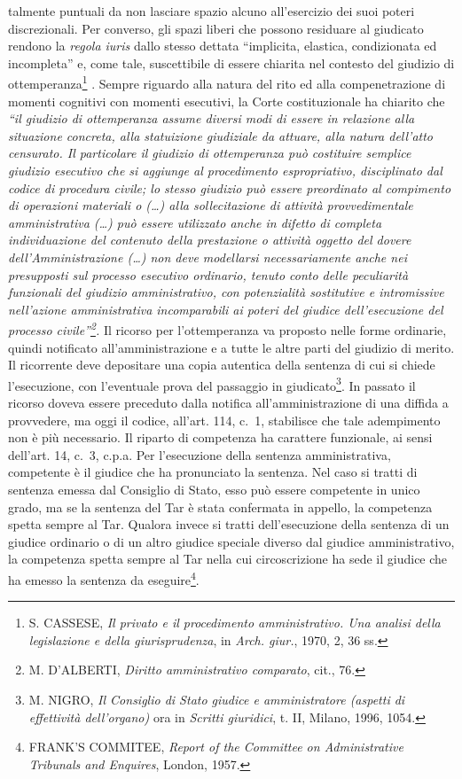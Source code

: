 \documentclass[12pt,it,a4paper,]{report}
\begin{document}
talmente puntuali da non lasciare spazio alcuno all'esercizio dei suoi
poteri discrezionali. Per converso, gli spazi liberi che possono
residuare al giudicato rendono la \emph{regola iuris} dallo stesso
dettata ``implicita, elastica, condizionata ed incompleta'' e, come
tale, suscettibile di essere chiarita nel contesto del giudizio di
ottemperanza\footnote{S. CASSESE, \emph{Il privato e il procedimento
  amministrativo. Una analisi della legislazione e della
  giurisprudenza}, in \emph{Arch. giur.}, 1970, 2, 36 ss.} . Sempre
riguardo alla natura del rito ed alla compenetrazione di momenti
cognitivi con momenti esecutivi, la Corte costituzionale ha chiarito che
\emph{``il giudizio di ottemperanza assume diversi modi di essere in
relazione alla situazione concreta, alla statuizione giudiziale da
attuare, alla natura dell'atto censurato. Il particolare il giudizio di
ottemperanza può costituire semplice giudizio esecutivo che si aggiunge
al procedimento espropriativo, disciplinato dal codice di procedura
civile; lo stesso giudizio può essere preordinato al compimento di
operazioni materiali o (\ldots) alla sollecitazione di attività
provvedimentale amministrativa (\ldots) può essere utilizzato anche in
difetto di completa individuazione del contenuto della prestazione o
attività oggetto del dovere dell'Amministrazione (\ldots) non deve
modellarsi necessariamente anche nei presupposti sul processo esecutivo
ordinario, tenuto conto delle peculiarità funzionali del giudizio
amministrativo, con potenzialità sostitutive e intromissive nell'azione
amministrativa incomparabili ai poteri del giudice dell'esecuzione del
processo civile''\footnote{M. D'ALBERTI, \emph{Diritto amministrativo
  comparato}, cit., 76.}.} Il ricorso per l'ottemperanza va proposto
nelle forme ordinarie, quindi notificato all'amministrazione e a tutte
le altre parti del giudizio di merito. Il ricorrente deve depositare una
copia autentica della sentenza di cui si chiede l'esecuzione, con
l'eventuale prova del passaggio in giudicato\footnote{M. NIGRO, \emph{Il
  Consiglio di Stato giudice e amministratore (aspetti di effettività
  dell'organo)} ora in \emph{Scritti giuridici}, t. II, Milano, 1996,
  1054.}. In passato il ricorso doveva essere preceduto dalla notifica
all'amministrazione di una diffida a provvedere, ma oggi il codice,
all'art. 114, c.~1, stabilisce che tale adempimento non è più
necessario. Il riparto di competenza ha carattere funzionale, ai sensi
dell'art. 14, c.~3, c.p.a. Per l'esecuzione della sentenza
amministrativa, competente è il giudice che ha pronunciato la sentenza.
Nel caso si tratti di sentenza emessa dal Consiglio di Stato, esso può
essere competente in unico grado, ma se la sentenza del Tar è stata
confermata in appello, la competenza spetta sempre al Tar. Qualora
invece si tratti dell'esecuzione della sentenza di un giudice ordinario
o di un altro giudice speciale diverso dal giudice amministrativo, la
competenza spetta sempre al Tar nella cui circoscrizione ha sede il
giudice che ha emesso la sentenza da eseguire\footnote{FRANK'S COMMITEE,
  \emph{Report of the Committee on Administrative Tribunals and
  Enquires}, London, 1957.}.
\end{document}
